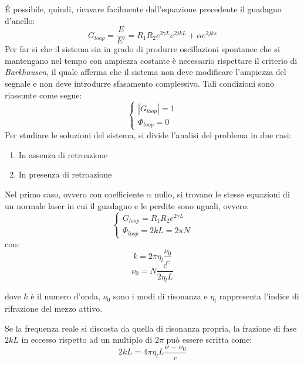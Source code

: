 \'E possibile, quindi, ricavare facilmente dall'equazione precedente il guadagno d'anello:
\begin{equation}
	G_{loop}=\frac{E}{E'}=R_1R_2e^{2\gamma L}e^{2jkL}+\alpha e^{2jks}
	\label{gloop}
\end{equation}
Per far si che il sistema sia in grado di produrre oscillazioni spontanee che si mantengano nel tempo con ampiezza costante è necessario rispettare il criterio di \textit{Barkhausen}, il quale afferma che il sistema non deve modificare l'ampiezza del segnale e non deve introdurre sfasamento complessivo. Tali condizioni sono riassunte come segue:
\begin{equation}
	\begin{cases}
   |G_{loop}|=1\\\Phi_{loop} = 0
   \end{cases}
\end{equation}
Per studiare le soluzioni del sistema, si divide l'analisi del problema in due casi:
\begin{enumerate}
	\item In assenza di retroazione 
	\item In presenza di retroazione
\end{enumerate}
Nel primo caso, ovvero con coefficiente $\alpha$ nullo, si trovano le stesse equazioni di un normale laser in cui il guadagno e le perdite sono uguali, ovvero:
\begin{equation}
	\begin{cases}
   G_{loop}=R_1R_2e^{2\gamma L}\\\Phi_{loop} = 2kL=2\pi N
   \end{cases}
   \label{sistnoretr}
\end{equation}
con:
\begin{equation}
k=2\pi \eta_l \frac{\nu_0}{c}	
\end{equation}
\begin{equation}
	\nu_0 = N\frac{c}{2 \eta_l L}
\end{equation}

dove $k$ è il numero d'onda, $\nu_0$ sono i modi di risonanza e $\eta_l$ rappresenta l'indice di rifrazione del mezzo attivo.

Se la frequenza reale si discosta da quella di risonanza propria, la frazione di fase $2kL$ in eccesso rispetto ad un multiplo di $2\pi$ può essere scritta come:
\begin{equation}
	2kL=4\pi \eta_l L \frac{\nu - \nu_0}{c}
\end{equation}

